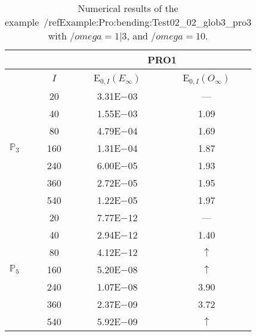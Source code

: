 \begin{table}[H]
\caption{Numerical results of the example~/ref{Example:Pro:bending:Test02_02_glob3_pro3} with $/omega=1|3$, and $/omega=10$.}
\setlength{\tabcolsep}{5pt}
\centering
\begin{tabular}{@{}l c c c@{}}
\toprule
 &  & \multicolumn{2}{c}{PRO1}\\
\midrule
 & $I$ & E$_{0,I}(E_{\infty})$ & E$_{0,I}(O_{\infty})$\\
\midrule
\multirow{7}{*}{$\mathbb{P}_{3}$}
 & 20 & 3.31E$-$03 & ---\\
 & 40 & 1.55E$-$03 & 1.09\\
 & 80 & 4.79E$-$04 & 1.69\\
 & 160 & 1.31E$-$04 & 1.87\\
 & 240 & 6.00E$-$05 & 1.93\\
 & 360 & 2.72E$-$05 & 1.95\\
 & 540 & 1.22E$-$05 & 1.97\\
\midrule
\multirow{7}{*}{$\mathbb{P}_{5}$}
 & 20 & 7.77E$-$12 & ---\\
 & 40 & 2.94E$-$12 & 1.40\\
 & 80 & 4.12E$-$12 & $\uparrow$\\
 & 160 & 5.20E$-$08 & $\uparrow$\\
 & 240 & 1.07E$-$08 & 3.90\\
 & 360 & 2.37E$-$09 & 3.72\\
 & 540 & 5.92E$-$09 & $\uparrow$\\
\bottomrule
\end{tabular}
\label{Table:PRO:test_02_02_test12_pro3}
\end{table}
